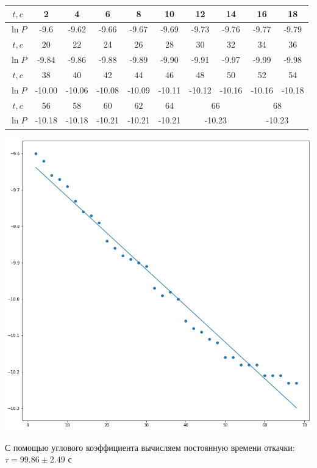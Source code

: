 \documentclass[12pt,a4paper]{article}
\begin{document}
\begin{enumerate}
	\begin{center}
		\begin{tabular}{|c|c|c|c|c|c|c|c|c|c|} \hline
			$t, c$ & 2 & 4 & 6 & 8 & 10 & 12 & 14 & 16 & 18 \\ \hline
			$\ln{P}$ & -9.6 & -9.62 & -9.66 & -9.67 & -9.69 & -9.73 & -9.76 & -9.77 & -9.79 \\ \hline
			$t, c$ & 20 & 22 & 24 & 26 & 28 & 30 & 32 & 34 & 36 \\ \hline
			$\ln{P}$ & -9.84 & -9.86 & -9.88 & -9.89 & -9.90 & -9.91 & -9.97 & -9.99 & -9.98 \\ \hline
			$t, c$ & 38 & 40 & 42 & 44 & 46 & 48 & 50 & 52 & 54 \\ \hline
			$\ln{P}$ & -10.00 & -10.06 & -10.08 & -10.09 & -10.11 & -10.12 & -10.16 & -10.16 & -10.18 \\ \hline
			$t, c$ & 56 & 58 & 60 & 62 & 64 & \multicolumn{2}{|c|}{66} & \multicolumn{2}{|c|}{68} \\ \hline
			$\ln{P}$ & -10.18 & -10.18 & -10.21 & -10.21 & -10.21 & \multicolumn{2}{|c|}{-10.23} & \multicolumn{2}{|c|}{-10.23} \\ \hline 
		\end{tabular}
	\end{center}
	
	\includegraphics[scale=0.6]{g2.png}
	
	С помощью углового коэффициента вычисляем постоянную времени откачки: \\
		$\tau = 99.86 \pm 2.49$ с \\
		

\end{enumerate}
\end{document}
